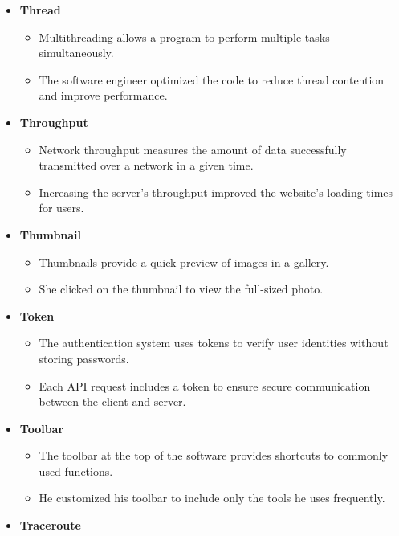 \begin{itemize}
\begin{itemize}
        \end{itemize}
        \item \textbf{Thread}
        \begin{itemize}
            \item Multithreading allows a program to perform multiple tasks simultaneously.
            \item The software engineer optimized the code to reduce thread contention and improve performance.
        \end{itemize}
        \item \textbf{Throughput}
        \begin{itemize}
            \item Network throughput measures the amount of data successfully transmitted over a network in a given time.
            \item Increasing the server's throughput improved the website's loading times for users.
        \end{itemize}
        \item \textbf{Thumbnail}
        \begin{itemize}
            \item Thumbnails provide a quick preview of images in a gallery.
            \item She clicked on the thumbnail to view the full-sized photo.
        \end{itemize}
        \item \textbf{Token}
        \begin{itemize}
            \item The authentication system uses tokens to verify user identities without storing passwords.
            \item Each API request includes a token to ensure secure communication between the client and server.
        \end{itemize}
        \item \textbf{Toolbar}
        \begin{itemize}
            \item The toolbar at the top of the software provides shortcuts to commonly used functions.
            \item He customized his toolbar to include only the tools he uses frequently.
        \end{itemize}
        \item \textbf{Traceroute}

\end{itemize}
